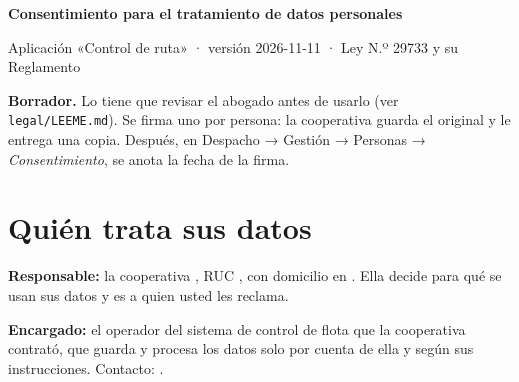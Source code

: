\documentclass[10.5pt,a4paper]{article}
\begin{document}

{\LARGE\bfseries Consentimiento para el tratamiento de datos personales}\par
{\small\color{tenue}Aplicación «Control de ruta» · versión 2026-11-11 · Ley N.º 29733 y su Reglamento}

\begin{borrador}
\textbf{Borrador.} Lo tiene que revisar el abogado antes de usarlo
(ver \texttt{legal/LEEME.md}). Se firma uno por persona: la cooperativa guarda
el original y le entrega una copia. Después, en Despacho → Gestión →
Personas → \emph{Consentimiento}, se anota la fecha de la firma.
\end{borrador}

\section{Quién trata sus datos}
\textbf{Responsable:} la cooperativa \llenar[7.5cm], RUC \llenar[3.2cm],
con domicilio en \llenar[9.5cm]. Ella decide para qué se usan sus datos y
es a quien usted les reclama.

\textbf{Encargado:} el operador del sistema de control de flota que la
cooperativa contrató, que guarda y procesa los datos solo por cuenta de ella
y según sus instrucciones. Contacto: \llenar[8cm].
\end{document}
